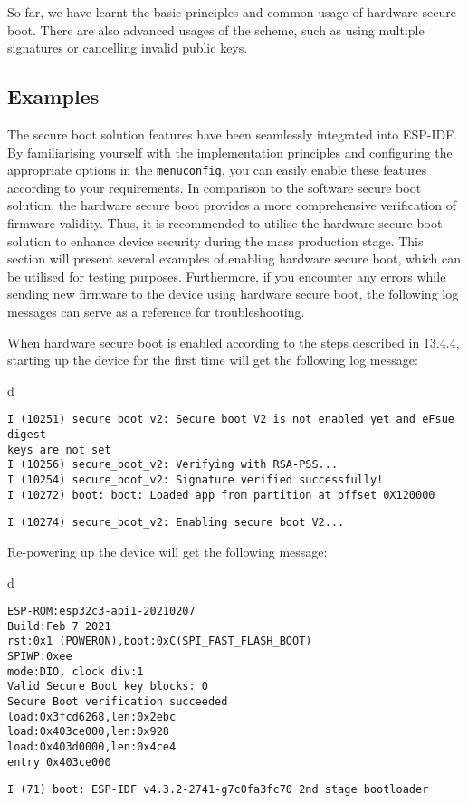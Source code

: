 \documentclass[a4paper,12pt]{book}
\begin{document}
So far, we have learnt the basic principles and common usage of hardware secure boot. There are also advanced usages of the scheme, such as using multiple signatures or cancelling invalid public keys.


\subsection{Examples}
The secure boot solution features have been seamlessly integrated into ESP-IDF. By familiarising yourself with the implementation principles and configuring the appropriate options in the \verb|menuconfig|, you can easily enable these features according to your requirements. In comparison to the software secure boot solution, the hardware secure boot provides a more comprehensive verification of firmware validity. Thus, it is recommended to utilise the hardware secure boot solution to enhance device security during the mass production stage. This section will present several examples of enabling hardware secure boot, which can be utilised for testing purposes. Furthermore, if you encounter any errors while sending new firmware to the device using hardware secure boot, the following log messages can serve as a reference for troubleshooting.

When hardware secure boot is enabled according to the steps described in 13.4.4, starting up the device for the first time will get the following log message:

\begin{codebloc}
\begin{tabular}{d}
\vspace{2pt}
\begin{verbatim}
I (10251) secure_boot_v2: Secure boot V2 is not enabled yet and eFsue digest 
keys are not set
I (10256) secure_boot_v2: Verifying with RSA-PSS...
I (10254) secure_boot_v2: Signature verified successfully!
I (10272) boot: boot: Loaded app from partition at offset 0X120000
\end{verbatim}
\verb|I (10274) secure_boot_v2: Enabling secure boot V2...|
\end{tabular}
\end{codebloc}

Re-powering up the device will get the following message:

\begin{codebloc}
\begin{tabular}{d}
\vspace{2pt}
\begin{verbatim}
ESP-ROM:esp32c3-api1-20210207
Build:Feb 7 2021
rst:0x1 (POWERON),boot:0xC(SPI_FAST_FLASH_BOOT)
SPIWP:0xee
mode:DIO, clock div:1
Valid Secure Boot key blocks: 0
Secure Boot verification succeeded
load:0x3fcd6268,len:0x2ebc
load:0x403ce000,len:0x928
load:0x403d0000,len:0x4ce4
entry 0x403ce000
\end{verbatim}
\verb|I (71) boot: ESP-IDF v4.3.2-2741-g7c0fa3fc70 2nd stage bootloader|
\end{tabular}
\end{codebloc}
\end{document}

